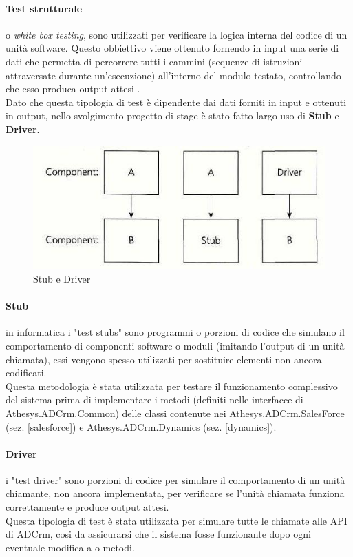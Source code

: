 \documentclass[12pt,a4paper,twoside,openany,english]{book}
\begin{document}
\paragraph{Test strutturale}
o \textit{white box testing}, sono utilizzati per verificare la logica interna del codice di un unità software. Questo obbiettivo viene ottenuto fornendo in input una serie di dati che permetta di percorrere tutti i cammini (sequenze di istruzioni attraversate durante un'esecuzione) all'interno del modulo testato, controllando che esso produca output attesi .\\
Dato che questa tipologia di test è dipendente dai dati forniti in input e ottenuti in output, nello svolgimento progetto di stage è stato fatto largo uso di \textbf{Stub} e \textbf{Driver}.

\begin{figure}[H]
	\centering
	\includegraphics[width=\linewidth]{images/stubDriver}
	\caption{Stub e Driver}
	\label{fig:stubdriver}
\end{figure}

\paragraph{Stub} 
in informatica i "test stubs" sono programmi o porzioni di codice che simulano il comportamento di componenti software o moduli (imitando l'output di un unità chiamata), essi vengono spesso utilizzati per sostituire elementi non ancora codificati.\\
Questa metodologia è stata utilizzata per testare il funzionamento complessivo del sistema prima di implementare i metodi (definiti nelle interfacce di Athesys.ADCrm.Common) delle classi contenute nei  Athesys.ADCrm.SalesForce (sez. \ref{salesforce}) e Athesys.ADCrm.Dynamics (sez. \ref{dynamics}).

\paragraph{Driver} 
i "test driver" sono porzioni di codice per simulare il comportamento di un unità chiamante, non ancora implementata, per verificare se l'unità chiamata funziona correttamente e produce output attesi.\\
Questa tipologia di test è stata utilizzata per simulare tutte le chiamate alle API di ADCrm, cosi da assicurarsi che il sistema fosse funzionante dopo ogni eventuale modifica a  o metodi.
\end{document}
